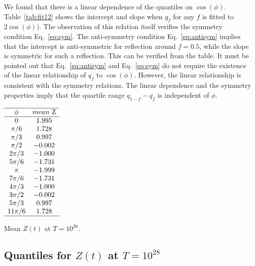 \documentclass[twoside]{article}
\begin{document}
We found that there is a linear dependence of the quantiles on $\cos(\phi)$. Table~\ref{tab:fit12} shows the intercept and slope when $q_f$ for any $f$ is fitted to
$2\cos(\phi))$. The observation of this relation itself verifies the symmetry condition Eq.~\ref{eq:sym}. The anti-symmetry condition Eq.~\ref{eq:antisym} implies that the intercept is anti-symmetric for reflection around $f=0.5$, while the slope is symmetric for such a reflection. This can be verified from the table. It must be pointed out that Eq.~\ref{eq:antisym} and Eq.~\ref{eq:sym} do not require the
existence of the linear relationship of $q_f$ to $\cos(\phi)$. However, the linear relationship is consistent with the symmetry relations.
The linear dependence and the symmetry properties imply that the quartile range $q_{1-f}-q_f$ is independent of $\phi$.

\begin{table}
\centering \(\begin{array}{cc}
\hline
\phi&mean~$Z$ \\
\hline
0&1.995\\
\pi/6 &1.728\\
\pi/3 &0.997\\
\pi/2 &-0.002\\
2\pi/3 &-1.000\\
5\pi/6 &-1.731\\
\pi &-1.999\\
7\pi/6 &-1.731\\
4\pi/3 &-1.000\\
3\pi/2 &-0.002\\
5\pi/3 &0.997\\
11\pi/6 &1.728\\
\hline
\end{array}\)
\caption{Mean    $Z(t)$ at $T=10^{28}$.}
\label{tab:mean28}
\end{table}


\subsection{\label{E28}Quantiles for $Z(t)$ at $T=10^{28}$}
\end{document}
